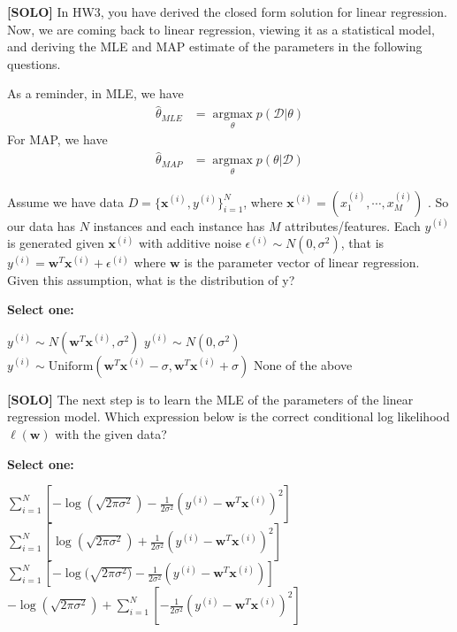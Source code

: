 \documentclass[11pt,addpoints,answers]{exam}
\newcommand{\Dc}{\mathcal{D}}
\newcommand \argmax {\operatorname*{argmax}}
\newcommand{\solo}{\textbf{[SOLO]} }
\begin{document}
\begin{questions}
    
    \question[3] \solo In HW3, you have derived the closed form solution for linear regression. Now, we are coming back to linear regression, viewing it as a statistical model, and deriving the MLE and MAP estimate of the parameters in the following questions. 
    
    As a reminder, in MLE, we have
    \begin{align*}
        \hat{\theta}_{MLE} &= \argmax_\theta p(\Dc | \theta)
    \end{align*}
    For MAP, we have
    \begin{align*}
        \hat{\theta}_{MAP} &= \argmax_\theta p(\theta|\Dc)
    \end{align*}
    
    Assume we have data $D = \{\mathbf{x}^{(i)}, y^{(i)}\}_{i=1}^{N}$, where $\mathbf{x}^{(i)} = (x_1^{(i)}, \cdots, x_M^{(i)})$ . So our data has $N$  instances and each instance has $M$  attributes/features. Each $y^{(i)}$ is generated given $\mathbf{x}^{(i)}$ with additive noise $\epsilon^{(i)} \sim N(0, \sigma^2)$, that is $y^{(i)} = \mathbf{w}^T \mathbf{x}^{(i)} + \epsilon^{(i)}$ where $\mathbf{w}$  is the parameter vector of linear regression. Given this assumption, what is the distribution of y? 

    \textbf{Select one:}
    \begin{checkboxes}
        \CorrectChoice $y^{(i)} \sim N(\mathbf{w}^T \mathbf{x}^{(i)}, \sigma^2)$
        \choice $y^{(i)} \sim N(0, \sigma^2)$
        \choice $y^{(i)} \sim \text{Uniform}(\mathbf{w}^T \mathbf{x}^{(i)} - \sigma,  \mathbf{w}^T \mathbf{x}^{(i)} + \sigma)$
        \choice None of the above
    \end{checkboxes}
    
    
    \question[3] \solo The next step is to learn the MLE of the parameters of the linear regression model. Which expression below is the correct conditional log likelihood $\ell(\mathbf{w})$ with the given data?

    \textbf{Select one:}
    \begin{checkboxes}
        \CorrectChoice $\sum_{i=1}^{N} [-\log (\sqrt{2\pi\sigma^2}) - \frac{1}{2\sigma^2} (y^{(i)} - \mathbf{w}^T\mathbf{x}^{(i)})^2]$
        \choice $\sum_{i=1}^{N} [\log (\sqrt{2\pi\sigma^2}) + \frac{1}{2\sigma^2} (y^{(i)} - \mathbf{w}^T\mathbf{x}^{(i)})^2]$
        \choice $\sum_{i=1}^{N} [-\log(\sqrt{2\pi\sigma^2)} - \frac{1}{2\sigma^2} (y^{(i)} - \mathbf{w}^T\mathbf{x}^{(i)})]$
        \choice $-\log (\sqrt{2\pi\sigma^2}) + \sum_{i=1}^{N} [-\frac{1}{2\sigma^2} (y^{(i)} - \mathbf{w}^T\mathbf{x}^{(i)})^2]$
    \end{checkboxes}
    

\end{questions}
\end{document}
